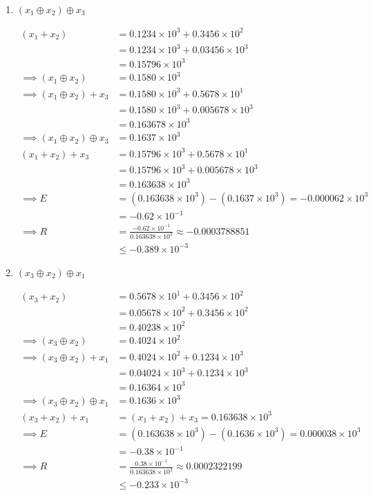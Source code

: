 \documentclass[12pt]{article}
\begin{document}
\begin{enumerate}[\ \ (a)\ \ ]
\item $(x_1 \oplus x_2) \oplus x_3$
\begin{align*}
(x_1 + x_2) &= 0.1234 \times 10^3 + 0.3456 \times 10^2 \\
&= 0.1234 \times 10^3 + 0.03456 \times 10^3 \\
&= 0.15796 \times 10^3 \\
\implies (x_1 \oplus x_2) &= 0.1580 \times 10^3 \\
\implies (x_1 \oplus x_2) + x_3 &= 0.1580 \times 10^3 + 0.5678 \times 10^1 \\
&= 0.1580 \times 10^3 + 0.005678 \times 10^3 \\
&= 0.163678 \times 10^3 \\
\implies (x_1 \oplus x_2) \oplus x_3 &= \boxed{0.1637 \times 10^3} \\
(x_1 + x_2) + x_3 &= 0.15796 \times 10^3 + 0.5678 \times 10^1 \\ 
&= 0.15796 \times 10^3 + 0.005678 \times 10^3 \\
&= 0.163638 \times 10^3 \\
\implies E &= (0.163638 \times 10^3) - (0.1637 \times 10^3) = -0.000062 \times 10^{3} \\
&= \boxed{-0.62 \times 10^{-1}} \\
\implies R &= \frac{-0.62 \times 10^{-1}}{0.163638 \times 10^3} \approx -0.0003788851 \\
&\leq \boxed{-0.389 \times 10^{-3}}
\end{align*}

\item $(x_3 \oplus x_2) \oplus x_1$
\begin{align*}
(x_3 + x_2) &= 0.5678 \times 10^1 + 0.3456 \times 10^2 \\
&= 0.05678 \times 10^2 + 0.3456 \times 10^2 \\
&= 0.40238 \times 10^2 \\
\implies (x_3 \oplus x_2) &= 0.4024 \times 10^2 \\
\implies (x_3 \oplus x_2) + x_1 &= 0.4024 \times 10^2 + 0.1234 \times 10^3 \\
&= 0.04024 \times 10^3 + 0.1234 \times 10^3 \\
&= 0.16364 \times 10^3 \\
\implies (x_3 \oplus x_2) \oplus x_1 &= \boxed{0.1636 \times 10^3} \\
(x_3 + x_2) + x_1 &= (x_1 + x_2) + x_3 = 0.163638 \times 10^3 \\
\implies E &= (0.163638 \times 10^3) - (0.1636 \times 10^3) = 0.000038 \times 10^3 \\
&= \boxed{-0.38 \times 10^{-1}} \\
\implies R &= \frac{0.38 \times 10^{-1}}{0.163638 \times 10^3} \approx 0.0002322199 \\
&\leq \boxed{-0.233 \times 10^{-3}}
\end{align*}


\end{enumerate}
\end{document}
